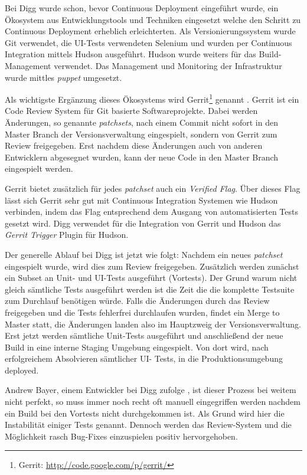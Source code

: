  Bei Digg wurde schon, bevor Continuous Deployment
eingeführt wurde, ein Ökosystem aus Entwicklungstools und Techniken eingesetzt
welche den Schritt zu Continuous Deployment erheblich erleichterten. Als
Versionierungssystem wurde Git verwendet, die UI-Tests verwendeten Selenium
und wurden per Continuous Integration mittels Hudson ausgeführt. Hudson wurde
weiters für das Build-Management verwendet. Das Management und Monitoring der
Infrastruktur wurde mittles \emph{puppet} umgesetzt.

Als wichtigste Ergänzung dieses Ökosystems wird Gerrit\footnote{Gerrit:
\url{http://code.google.com/p/gerrit/}} genannt \cite{digg4}. Gerrit ist ein
Code Review System für Git basierte Softwareprojekte. Dabei werden Änderungen,
so genannte \emph{patchsets}, nach einem Commit nicht sofort in den Master
Branch der Versionsverwaltung eingespielt, sondern von Gerrit zum Review
freigegeben. Erst nachdem diese Änderungen auch von anderen Entwicklern
abgesegnet wurden, kann der neue Code in den Master Branch eingespielt werden.

Gerrit bietet zusätzlich für jedes \emph{patchset} auch ein \emph{Verified
Flag}. Über dieses Flag lässt sich Gerrit sehr gut mit Continuous Integration
Systemen wie Hudson verbinden, indem das Flag entsprechend dem Ausgang von
automatisierten Tests gesetzt wird. Digg verwendet für die Integration von
Gerrit und Hudson das \emph{Gerrit Trigger} Plugin für Hudson.

Der generelle Ablauf bei Digg ist jetzt wie folgt: Nachdem ein neues
\emph{patchset} eingespielt wurde, wird dies zum Review freigegeben.
Zusätzlich werden zunächst ein Subset an Unit- und UI-Tests ausgeführt
(Vortests). Der Grund warum nicht gleich sämtliche Tests ausgeführt werden ist
die Zeit die die komplette Testsuite zum Durchlauf benötigen würde. Falls die
Änderungen durch das Review freigegeben und die Tests fehlerfrei durchlaufen
wurden, findet ein Merge to Master statt, die Änderungen landen also im
Hauptzweig der Versionsverwaltung. Erst jetzt werden sämtliche Unit-Tests
ausgeführt und anschließend der neue Build in eine interne Staging Umgebung
eingespielt. Von dort wird, nach erfolgreichem Absolvieren sämtlicher UI-
Tests, in die Produktionsumgebung deployed.

Andrew Bayer, einem Entwickler bei Digg zufolge \cite{digg4}, ist dieser
Prozess bei weitem nicht perfekt, so muss immer noch recht oft manuell
eingegriffen werden nachdem ein Build bei den Vortests nicht durchgekommen
ist. Als Grund wird hier die Instabilität einiger Tests genannt. Dennoch
werden das Review-System und die Möglichkeit rasch Bug-Fixes einzuspielen
positiv hervorgehoben.



